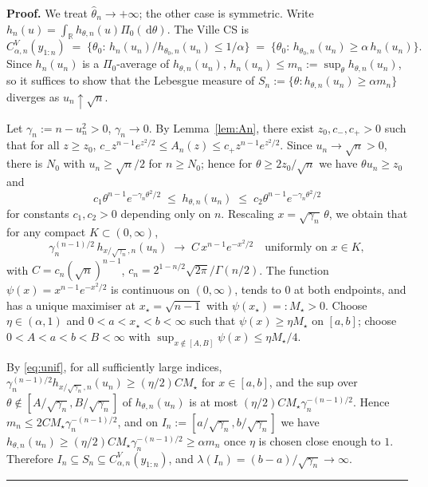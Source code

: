 \documentclass{article}%
\newenvironment{proof}[1][Proof]{\noindent\textbf{#1.} }{\ \rule{0.5em}{0.5em}}
\newcommand{\R}{\mathbb{R}}
\newcommand{\dd}{\,\mathrm{d}}
\begin{document}
\begin{proof}
We treat \(\widehat\theta_n\to+\infty\); the other case is symmetric.
Write \(h_n(u)=\int_\R h_{\theta,n}(u)\Pi_0(\dd\theta)\). The Ville CS
is
\[
  C^V_{\alpha,n}(y_{1:n})\;=\;\bigl\{\theta_0:\,h_n(u_n)/h_{\theta_0,n}(u_n)
   \leq 1/\alpha\bigr\}\;=\;\bigl\{\theta_0:\,h_{\theta_0,n}(u_n)\geq \alpha\,
   h_n(u_n)\bigr\}.
\]
Since \(h_n(u_n)\) is a \(\Pi_0\)-average of \(h_{\theta,n}(u_n)\),
\(h_n(u_n)\leq m_n:=\sup_\theta h_{\theta,n}(u_n)\), so it suffices
to show that the Lebesgue measure of
\(S_n:=\{\theta:h_{\theta,n}(u_n)\geq \alpha m_n\}\) diverges as
\(u_n\uparrow\sqrt n\).

Let \(\gamma_n:=n-u_n^2>0\), \(\gamma_n\to 0\). By Lemma~\ref{lem:An},
there exist \(z_0,c_-,c_+>0\) such that for all \(z\geq z_0\),
\(c_-z^{n-1}e^{z^2/2}\leq A_n(z)\leq c_+z^{n-1}e^{z^2/2}\).
Since \(u_n\to\sqrt n>0\), there is \(N_0\) with
\(u_n\geq \sqrt n/2\) for \(n\geq N_0\); hence for
\(\theta\geq 2z_0/\sqrt n\) we have \(\theta u_n\geq z_0\) and
\begin{equation}\label{eq:sandwich}
  c_1\theta^{n-1}e^{-\gamma_n\theta^2/2}
  \;\leq\;
  h_{\theta,n}(u_n)
  \;\leq\;
  c_2\theta^{n-1}e^{-\gamma_n\theta^2/2}
\end{equation}
for constants \(c_1,c_2>0\) depending only on \(n\). Rescaling
\(x=\sqrt{\gamma_n}\,\theta\), we obtain that for any compact
\(K\subset(0,\infty)\),
\begin{equation}\label{eq:unif}
  \gamma_n^{(n-1)/2}\,h_{x/\sqrt{\gamma_n},n}(u_n)\;\longrightarrow\;
  C\,x^{n-1}e^{-x^2/2}\quad\text{uniformly on } x\in K,
\end{equation}
with \(C=c_n(\sqrt n)^{n-1}\),
\(c_n=2^{1-n/2}\sqrt{2\pi}/\Gamma(n/2)\). The function
\(\psi(x)=x^{n-1}e^{-x^2/2}\) is continuous on \((0,\infty)\), tends
to \(0\) at both endpoints, and has a unique maximiser at
\(x_\star=\sqrt{n-1}\) with \(\psi(x_\star)=:M_\star>0\). Choose
\(\eta\in(\alpha,1)\) and \(0<a<x_\star<b<\infty\) such that
\(\psi(x)\geq \eta M_\star\) on \([a,b]\); choose
\(0<A<a<b<B<\infty\) with \(\sup_{x\notin[A,B]}\psi(x)\leq\eta M_\star/4\).

By \eqref{eq:unif}, for all sufficiently large indices,
\(\gamma_n^{(n-1)/2}h_{x/\sqrt{\gamma_n},n}(u_n)\geq (\eta/2)CM_\star\)
for \(x\in[a,b]\), and the sup over
\(\theta\notin[A/\sqrt{\gamma_n},B/\sqrt{\gamma_n}]\) of
\(h_{\theta,n}(u_n)\) is at most \((\eta/2)CM_\star\gamma_n^{-(n-1)/2}\).
Hence
\(m_n\leq 2CM_\star\gamma_n^{-(n-1)/2}\), and on
\(I_n:=[a/\sqrt{\gamma_n},b/\sqrt{\gamma_n}]\) we have
\(h_{\theta,n}(u_n)\geq(\eta/2)CM_\star\gamma_n^{-(n-1)/2}\geq \alpha m_n\)
once \(\eta\) is chosen close enough to \(1\). Therefore
\(I_n\subseteq S_n\subseteq C^V_{\alpha,n}(y_{1:n})\), and
\(\lambda(I_n)=(b-a)/\sqrt{\gamma_n}\to\infty\).
\end{proof}
\end{document}
